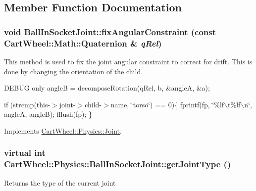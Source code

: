 \subsection{Member Function Documentation}
\hypertarget{classCartWheel_1_1Physics_1_1BallInSocketJoint_a4d40c7d01cbb85ff85f5177cbb19a9ff}{
\subsubsection[{fixAngularConstraint}]{\setlength{\rightskip}{0pt plus 5cm}void BallInSocketJoint::fixAngularConstraint (const {\bf CartWheel::Math::Quaternion} \& {\em qRel})}}
\label{classCartWheel_1_1Physics_1_1BallInSocketJoint_a4d40c7d01cbb85ff85f5177cbb19a9ff}
This method is used to fix the joint angular constraint to correct for drift. This is done by changing the orientation of the child. 

DEBUG only angleB = decomposeRotation(qRel, b, \&angleA, \&a);

if (strcmp(this-\/$>$joint-\/$>$child-\/$>$name, \char`\"{}torso\char`\"{}) == 0)\{ fprintf(fp, \char`\"{}\%lf$\backslash$t\%lf$\backslash$n\char`\"{}, angleA, angleB); fflush(fp); \}



Implements \hyperlink{classCartWheel_1_1Physics_1_1Joint_ab14f1e87562d9f5993504621d2cf3569}{CartWheel::Physics::Joint}.

\hypertarget{classCartWheel_1_1Physics_1_1BallInSocketJoint_a8d42a8e2cd4e5b84b951411aa6344721}{
\subsubsection[{getJointType}]{\setlength{\rightskip}{0pt plus 5cm}virtual int CartWheel::Physics::BallInSocketJoint::getJointType ()}}
\label{classCartWheel_1_1Physics_1_1BallInSocketJoint_a8d42a8e2cd4e5b84b951411aa6344721}
Returns the type of the current joint 

